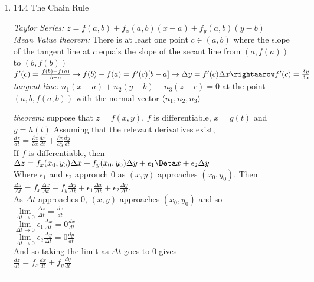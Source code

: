 \documentclass[11pt]{article}
\newenvironment{proof}{{\bf Proof:  }}{\hfill\rule{2mm}{2mm}}
\begin{document}
\begin{enumerate}
\begin{center}
\end{center}





\item 14.4 The Chain Rule

\textit{Taylor Series:} 
$z=f(a,b)+f_x(a,b)(x-a)+f_y(a,b)(y-b)$
\\
\textit{Mean Value theorem:}
There is at least one point $c \in (a,b)$ where the slope of the tangent line at $c$ equals the slope of the secant line from $(a,f(a))$ to $(b,f(b))$
\\
$f'(c)=\frac{f(b)-f(a)}{b-a} \rightarrow f(b)-f(a)=f'(c)[b-a] \rightarrow \Delta y = f'(c) \Delta x \rightaarow f'(c)=\frac{\delta y}{\delta x}$
\\
\textit{tangent line:} $n_1(x-a)+n_2(y-b)+n_3(z-c)=0$ at the point $(a,b,f(a,b))$ with the normal vector $\langle n_1, n_2, n_3 \rangle$
\\
\begin{center}
\textit{theorem:} 
suppose that $z=f(x,y)$, $f$ is differentiable, $x=g(t)$ and $y=h(t)$ Assuming that the relevant derivatives exist,
\\
$\frac{dz}{dt}=\frac{\partial z}{\partial x}\frac{dx}{dt}+\frac{\partial z}{\partial y} \frac{dy}{dt}$
\\
\begin{proof}
If $f$ is differentiable, then
\\
$\Delta z= f_x (x_0,y_0) \Delta x+ f_y (x_0,y_0) \Delta y + \epsilon_1 \Deta x + \epsilon_2 \Delta y$
\\
Where $\epsilon_1$ and $\epsilon_2$ approuch $0$ as $(x,y)$ approaches $(x_0,y_0)$. Then
\\
$\frac{\Delta z}{\Delta t}=f_x\frac{\Delta x}{\Delta t}+ f_y \frac{\Delta y}{\Delta t}+\epsilon_1 \frac{\Delta x}{\Delta t}+ \epsilon_2 \frac{\Delta y}{\Delta t}$.
\\
As $\Delta t$ approaches $0$, $(x,y)$ approaches $(x_0,y_0)$ and so
\\
$\lim \limits_{\Delta t \to 0} \frac{\Delta z}{\Delta t}=\frac{dz}{dt}$
\\
$\lim \limits_{\Delta t \to 0} \epsilon_1 \frac{\Delta x}{\Delta t}= 0 \frac{dx}{dt}$
\\
$\lim \limits_{\Delta t \to 0} \epsilon_2 \frac{\Delta y}{\Delta t}= 0 \frac{dy}{dt}$
\\
And so taking the limit as $\Delta t$ goes to $0$ gives
\\
$\frac{dz}{dt}=f_x\frac{dx}{dt}+f_y \frac{dy}{dt}$



\end{proof}
\end{center}
\end{enumerate}
\end{document}
